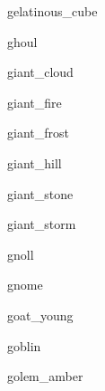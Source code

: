 \documentclass[letterpaper,serif]{module}
\begin{document}
\begin{newmonster}{gelatinous_cube}\end{newmonster}

\begin{newmonster}{ghoul}\end{newmonster}

\begin{newmonster}{giant_cloud}\end{newmonster}

\begin{newmonster}{giant_fire}\end{newmonster}

\begin{newmonster}{giant_frost}\end{newmonster}

\begin{newmonster}{giant_hill}\end{newmonster}

\begin{newmonster}{giant_stone}\end{newmonster}

\begin{newmonster}{giant_storm}\end{newmonster}

\begin{newmonster}{gnoll}\end{newmonster}

\begin{newmonster}{gnome}\end{newmonster}

\begin{newmonster}{goat_young}\end{newmonster}

\begin{newmonster}{goblin}\end{newmonster}

\begin{newmonster}{golem_amber}\end{newmonster}
\end{document}
